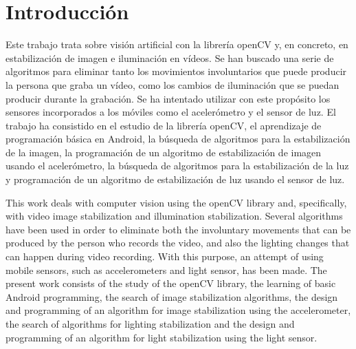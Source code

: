 \documentclass[a4paper,openright, 12pt]{book}
\begin{document}
\chapter*{Introducción}
%
Este trabajo trata sobre visión artificial con la librería openCV y, en concreto, en estabilización de imagen e iluminación en vídeos. Se han buscado una serie de algoritmos para eliminar tanto los movimientos involuntarios que puede producir la persona que graba un vídeo, como los cambios de iluminación que se puedan producir durante la grabación. Se ha intentado utilizar con este propósito los sensores incorporados a los móviles como el acelerómetro y el sensor de luz. El trabajo ha consistido en el estudio de la librería openCV, el aprendizaje de programación básica en Android, la búsqueda de algoritmos para la estabilización de la imagen, la programación de un algoritmo de estabilización de imagen usando el acelerómetro, la búsqueda de algoritmos para la estabilización de la luz y programación de un algoritmo de estabilización de luz usando el sensor de luz.
\newline
\newline
\newline
\newline

This work deals with computer vision using the openCV library and, specifically, with video image stabilization and illumination stabilization. Several algorithms have been used in order to eliminate both the involuntary movements that can be produced by the person who records the video, and also the lighting changes that can happen during video recording.
With this purpose, an attempt of using mobile sensors, such as accelerometers and light sensor, has been made.
The present work consists of the study of the openCV library, the learning of basic Android programming, the search of image stabilization algorithms, the design and programming of an algorithm for image stabilization using the accelerometer, the search of algorithms for lighting stabilization and the design and programming of an algorithm for light stabilization using the light sensor.
\end{document}
